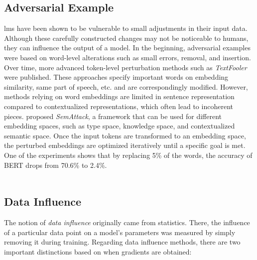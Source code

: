 \subsection{Adversarial Example}
\acrlong{lm}s have been shown to be vulnerable to small adjustments in their input data. Although these carefully constructed changes may not be noticeable to humans, they can influence the output of a model. In the beginning, adversarial examples were based on word-level alterations such as small errors, removal, and insertion. Over time, more advanced token-level perturbation methods such as \textit{TextFooler} \cite{jin2020bertreallyrobuststrong} were published. These approaches specify important words on embedding similarity, same part of speech, etc. and are correspondingly modified. However, methods relying on word embeddings are limited in sentence representation compared to contextualized representations, which often lead to incoherent pieces.
\cite{wang2022semattacknaturaltextualattacks} proposed \textit{SemAttack}, a framework that can be used for different embedding spaces, such as type space, knowledge space, and contextualized semantic space. Once the input tokens are transformed to an embedding space, the perturbed embeddings are optimized iteratively until a specific goal is met. One of the experiments shows that by replacing 5\% of the words, the accuracy of BERT drops from 70.6\% to 2.4\%. 
\\\\

\subsection{Data Influence} \label{subsec:data_influence}
The notion of \textit{data influence} originally came from statistics. There, the influence of a particular data point on a model's parameters was measured by simply removing it during training. Regarding data influence methods, there are two important distinctions based on when gradients are obtained:
